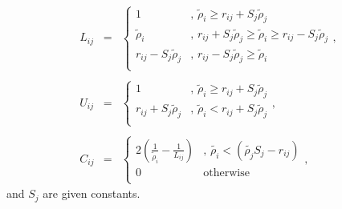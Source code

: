 \documentclass[12pt]{article}
\begin{document}
\begin{eqnarray}
\label{Lijeqn}
L_{ij}& = &\left\{ \begin{array}{rl}
    1 &\mbox{, $\tilde{\rho}_{i} {\geq} r_{ij} + S_{j}\tilde{\rho}_{j}$} \\
    \tilde{\rho}_{i} &\mbox{, $r_{ij} + S_{j}\tilde{\rho}_{j} {\geq} \tilde{\rho}_{i} {\geq} r_{ij} - S_{j}\tilde{\rho}_{j}$} \\
    r_{ij} - S_{j}\tilde{\rho}_{j} &\mbox{, $r_{ij} - S_{j}\tilde{\rho}_{j} {\geq} \tilde{\rho}_{i}$ } \\
        \end{array} \right.,\\ \nonumber \\
\label{Uijeqn}
U_{ij} &=& \left\{ \begin{array}{rl}
      1 &\mbox{, $\tilde{\rho}_{i} {\geq} r_{ij} + S_{j}\tilde{\rho}_{j}$} \\
      r_{ij} + S_{j}\tilde{\rho}_{j} &\mbox {, $\tilde{\rho}_{i} < r_{ij} + S_{j}\tilde{\rho}_{j}$} \\
          \end{array} \right.      ,\\ \nonumber \\
\label{Cijeqn}
C_{ij} &=& \left\{ \begin{array}{rl}
   2(\frac{1}{\tilde{\rho}_{i}} - \frac{1}{L_{ij}}) &\mbox{, $\tilde{{\rho}_{i}} < ( \tilde{{\rho}_{j}}S_{j} - r_{ij})$} \\
   0 &\mbox{otherwise} \\
           \end{array} \right.,
\end{eqnarray}
and $S_j$ are given constants.
\end{document}
